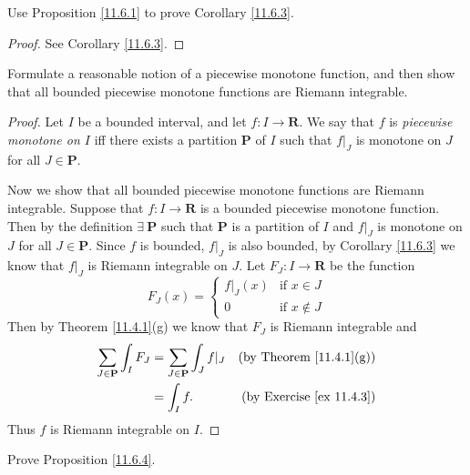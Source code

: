 \exercisesection

\begin{exercise}\label{ex 11.6.1}
    Use Proposition \ref{11.6.1} to prove Corollary \ref{11.6.3}.
\end{exercise}

\begin{proof}
    See Corollary \ref{11.6.3}.
\end{proof}

\begin{exercise}\label{ex 11.6.2}
    Formulate a reasonable notion of a piecewise monotone function, and then show that all bounded piecewise monotone functions are Riemann integrable.
\end{exercise}

\begin{proof}
    Let \(I\) be a bounded interval, and let \(f : I \to \mathbf{R}\).
    We say that \(f\) is \emph{piecewise monotone on \(I\)} iff there exists a partition \(\mathbf{P}\) of \(I\) such that \(f|_J\) is monotone on \(J\) for all \(J \in \mathbf{P}\).

    Now we show that all bounded piecewise monotone functions are Riemann integrable.
    Suppose that \(f : I \to \mathbf{R}\) is a bounded piecewise monotone function.
    Then by the definition \(\exists\ \mathbf{P}\) such that \(\mathbf{P}\) is a partition of \(I\) and \(f|_J\) is monotone on \(J\) for all \(J \in \mathbf{P}\).
    Since \(f\) is bounded, \(f|_J\) is also bounded, by Corollary \ref{11.6.3} we know that \(f|_J\) is Riemann integrable on \(J\).
    Let \(F_J : I \to \mathbf{R}\) be the function
    \[
        F_J(x) = \begin{cases}
            f|_J(x) & \text{if } x \in J    \\
            0       & \text{if } x \notin J
        \end{cases}
    \]
    Then by Theorem \ref{11.4.1}(g) we know that \(F_J\) is Riemann integrable and
    \begin{align*}
        \sum_{J \in \mathbf{P}} \int_I F_J & = \sum_{J \in \mathbf{P}} \int_J f|_J & \text{(by Theorem \ref{11.4.1}(g))}  \\
                                           & = \int_I f.                           & \text{(by Exercise \ref{ex 11.4.3})}
    \end{align*}
    Thus \(f\) is Riemann integrable on \(I\).
\end{proof}

\begin{exercise}\label{ex 11.6.3}
    Prove Proposition \ref{11.6.4}.
\end{exercise}

